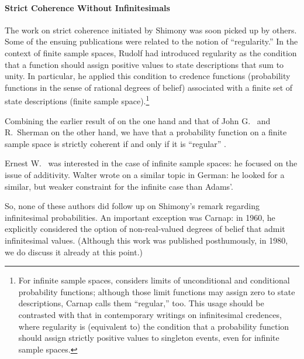 \paragraph{Strict Coherence Without Infinitesimals}
The work on strict coherence initiated by Shimony was soon picked up by others. Some of the ensuing publications were related to the notion of ``regularity.'' In the context of finite sample spaces, Rudolf \citet[Ch.~5]{Carnap:1950} had introduced regularity as the condition that a function should assign positive values to state descriptions that sum to unity. In particular, he applied this condition to credence functions (probability functions in the sense of rational degrees of belief) associated with a finite set of state descriptions (finite sample space).\footnote{For infinite sample spaces, \citet{Carnap:1950} considers limits of unconditional and conditional probability functions; although those limit functions may assign zero to state descriptions, Carnap calls them ``regular,'' too. This usage should be contrasted with that in contemporary writings on infinitesimal credences, where regularity is (equivalent to) the condition that a probability function should assign strictly positive values to singleton events, even for infinite sample spaces.}

Combining the earlier result of \citet{Shimony:1955} on the one hand and that of John G.~\citet{Kemeny:1955} and R.~Sherman \citet{Lehman:1955} on the other hand, we have that a probability function on a finite sample space is strictly coherent if and only if it is ``regular'' \citep[\textit{cf}.][p.~15]{Carnap:1971a}.

Ernest W.~\citet{Adams:1959,Adams:1962,Adams:1964} was interested in the case of infinite sample spaces: he focused on the issue of  additivity. Walter \citet{Oberschelp:1962} wrote on a similar topic in German: he looked for a similar, but weaker constraint for the infinite case than Adams'.

So, none of these authors did follow up on Shimony's remark regarding infinitesimal probabilities.
An important exception was Carnap: in 1960, he explicitly considered the option of non-real-valued degrees of belief that admit infinitesimal values. (Although this work was published posthumously, in 1980, we do discuss it already at this point.)

